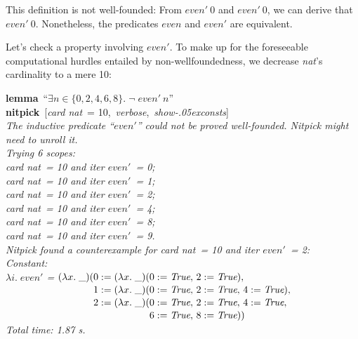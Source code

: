 \documentclass[a4paper,12pt]{article}
\def\unk{{\_}}
\def\unkef{(\lambda x.\; \unk)}
\renewcommand\_{\hbox{\textunderscore\kern-.05ex}}
\begin{document}
This definition is not well-founded: From $\textit{even}'~0$ and
$\textit{even}'~0$, we can derive that $\textit{even}'~0$. Nonetheless, the
predicates $\textit{even}$ and $\textit{even}'$ are equivalent.

Let's check a property involving $\textit{even}'$. To make up for the
foreseeable computational hurdles entailed by non-wellfoundedness, we decrease
\textit{nat}'s cardinality to a mere 10:

\prew
\textbf{lemma}~``$\exists n \in \{0, 2, 4, 6, 8\}.\;
\lnot\;\textit{even}'~n$'' \\
\textbf{nitpick}~[\textit{card nat}~= 10,\, \textit{verbose},\, \textit{show\_consts}] \\[2\smallskipamount]
\slshape
The inductive predicate ``$\textit{even}'\!$'' could not be proved well-founded.
Nitpick might need to unroll it. \\[2\smallskipamount]
Trying 6 scopes: \\
\hbox{}\qquad \textit{card nat}~= 10 and \textit{iter} $\textit{even}'$~= 0; \\
\hbox{}\qquad \textit{card nat}~= 10 and \textit{iter} $\textit{even}'$~= 1; \\
\hbox{}\qquad \textit{card nat}~= 10 and \textit{iter} $\textit{even}'$~= 2; \\
\hbox{}\qquad \textit{card nat}~= 10 and \textit{iter} $\textit{even}'$~= 4; \\
\hbox{}\qquad \textit{card nat}~= 10 and \textit{iter} $\textit{even}'$~= 8; \\
\hbox{}\qquad \textit{card nat}~= 10 and \textit{iter} $\textit{even}'$~= 9. \\[2\smallskipamount]
Nitpick found a counterexample for \textit{card nat}~= 10 and \textit{iter} $\textit{even}'$~= 2: \\[2\smallskipamount]
\hbox{}\qquad Constant: \nopagebreak \\
\hbox{}\qquad\qquad $\lambda i.\; \textit{even}'$ = $\unkef(\!\begin{aligned}[t]
& 0 := \unkef(0 := \textit{True},\, 2 := \textit{True}),\, \\[-2pt]
& 1 := \unkef(0 := \textit{True},\, 2 := \textit{True},\, 4 := \textit{True}),\, \\[-2pt]
& 2 := \unkef(0 := \textit{True},\, 2 := \textit{True},\, 4 := \textit{True},\, \\[-2pt]
& \phantom{2 := \unkef(}6 := \textit{True},\, 8 := \textit{True}))\end{aligned}$ \\[2\smallskipamount]
Total time: 1.87 s.
\postw
\end{document}
